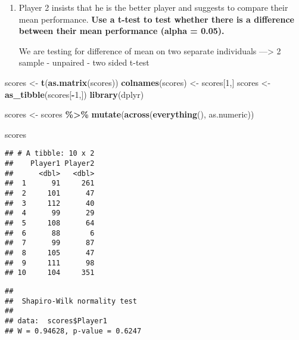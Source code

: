 \documentclass[
]{article}
\newenvironment{Shaded}{\begin{snugshade}}{\end{snugshade}}
\newcommand{\DecValTok}[1]{\textcolor[rgb]{0.00,0.00,0.81}{#1}}
\newcommand{\FunctionTok}[1]{\textcolor[rgb]{0.13,0.29,0.53}{\textbf{#1}}}
\newcommand{\NormalTok}[1]{#1}
\newcommand{\OtherTok}[1]{\textcolor[rgb]{0.56,0.35,0.01}{#1}}
\newcommand{\SpecialCharTok}[1]{\textcolor[rgb]{0.81,0.36,0.00}{\textbf{#1}}}
\begin{document}
\begin{enumerate}
\def\labelenumi{\alph{enumi}.}
\item
  Player 2 insists that he is the better player and suggests to compare
  their mean performance. \textbf{Use a t-test to test whether there is
  a difference between their mean performance (alpha = 0.05).}

  We are testing for difference of mean on two separate individuals
  ---\textgreater{} 2 sample - unpaired - two sided t-test
\end{enumerate}

\begin{Shaded}
\begin{Highlighting}[]
\NormalTok{scores }\OtherTok{\textless{}{-}} \FunctionTok{t}\NormalTok{(}\FunctionTok{as.matrix}\NormalTok{(scores))}
\FunctionTok{colnames}\NormalTok{(scores) }\OtherTok{\textless{}{-}}\NormalTok{ scores[}\DecValTok{1}\NormalTok{,]}
\NormalTok{scores }\OtherTok{\textless{}{-}} \FunctionTok{as\_tibble}\NormalTok{(scores[}\SpecialCharTok{{-}}\DecValTok{1}\NormalTok{,])}
\FunctionTok{library}\NormalTok{(dplyr)}

\NormalTok{scores }\OtherTok{\textless{}{-}}\NormalTok{ scores }\SpecialCharTok{\%\textgreater{}\%}
  \FunctionTok{mutate}\NormalTok{(}\FunctionTok{across}\NormalTok{(}\FunctionTok{everything}\NormalTok{(), as.numeric))}

\NormalTok{scores}
\end{Highlighting}
\end{Shaded}

\begin{verbatim}
## # A tibble: 10 x 2
##    Player1 Player2
##      <dbl>   <dbl>
##  1      91     261
##  2     101      47
##  3     112      40
##  4      99      29
##  5     108      64
##  6      88       6
##  7      99      87
##  8     105      47
##  9     111      98
## 10     104     351
\end{verbatim}

\begin{Shaded}
\end{Shaded}

\begin{verbatim}
## 
##  Shapiro-Wilk normality test
## 
## data:  scores$Player1
## W = 0.94628, p-value = 0.6247
\end{verbatim}
\end{document}
